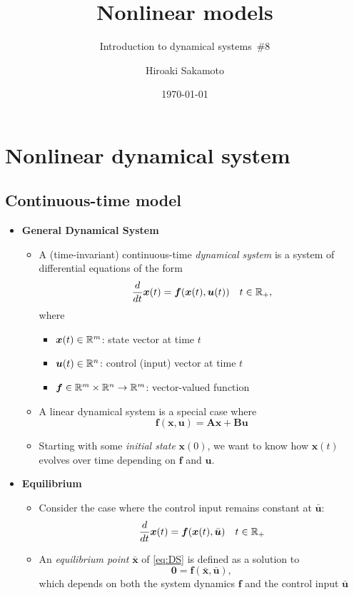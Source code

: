 \documentclass[12pt,a4paper]{article}
\title{Nonlinear models}
\subtitle{Introduction to dynamical systems~\#8}
\author{Hiroaki Sakamoto}
\date{\today}
\begin{document}
\maketitle
\tableofcontents

\section{Nonlinear dynamical system}

\subsection{Continuous-time model}

\begin{itemize}

\item \textbf{General Dynamical System}
  \begin{itemize}
  \item A (time-invariant) continuous-time \emph{dynamical system} is a system of differential equations of the form
    \begin{equation}\nonumber%
      \frac{d}{dt}\bm{x}(t) = \bm{f}(\bm{x}(t),\bm{u}(t)) \quad t \in \R_{+},
    \end{equation} where
    \begin{itemize}
    \item $\bm{x}(t)\in \mathbb{R}^{m}$: state vector at time $t$
    \item $\bm{u}(t)\in \mathbb{R}^{n}$: control (input) vector at time $t$
    \item $\bm{f} \in \mathbb{R}^{m}\times \mathbb{R}^{n} \to \mathbb{R}^{m}$: vector-valued function
    \end{itemize}
  \item A linear dynamical system is a special case where
    \begin{equation}\nonumber%
      \bm{f}(\bm{x},\bm{u}) =\bm{A}\bm{x} + \bm{B}\bm{u}
    \end{equation}
  \item Starting with some \emph{initial state} $\bm{x}(0)$, we want to know how $\bm{x}(t)$ evolves over time depending on $\bm{f}$ and $\bm{u}$.
  \end{itemize}
\item \textbf{Equilibrium}
  \begin{itemize}
  \item Consider the case where the control input remains constant at $\bar{\bm{u}}$:
    \begin{equation}\label{eq:DS}%
      \frac{d}{dt}\bm{x}(t) = \bm{f}(\bm{x}(t),\bar{\bm{u}}) \quad t\in \R_{+}
    \end{equation}
  \item An \emph{equilibrium point} $\bar{\bm{x}}$ of \eqref{eq:DS} is
    defined as a solution to
    \begin{equation}\nonumber%
      \bm{0} =
      \bm{f}(\bar{\bm{x}},\bar{\bm{u}}),
    \end{equation} which depends on both the system dynamics $\bm{f}$ and the control input $\bar{\bm{u}}$
  \end{itemize}


\end{itemize}
\end{document}
